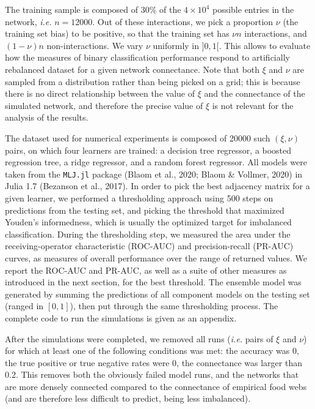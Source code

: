 \documentclass[10pt,oneside]{article}
\begin{document}
The training sample is composed of 30\% of the \(4\times 10^4\) possible
entries in the network, \emph{i.e.} \(n=12000\). Out of these
interactions, we pick a proportion \(\nu\) (the training set bias) to be
positive, so that the training set has \(\nu n\) interactions, and
\((1-\nu) n\) non-interactions. We vary \(\nu\) uniformly in \(]0,1[\).
This allows to evaluate how the measures of binary classification
performance respond to artificially rebalanced dataset for a given
network connectance. Note that both \(\xi\) and \(\nu\) are sampled from
a distribution rather than being picked on a grid; this is because there
is no direct relationship between the value of \(\xi\) and the
connectance of the simulated network, and therefore the precise value of
\(\xi\) is not relevant for the analysis of the results.

The dataset used for numerical experiments is composed of 20000 such
\((\xi, \nu)\) pairs, on which four learners are trained: a decision
tree regressor, a boosted regression tree, a ridge regressor, and a
random forest regressor. All models were taken from the \texttt{MLJ.jl}
package (Blaom et al., 2020; Blaom \& Vollmer, 2020) in Julia 1.7
(Bezanson et al., 2017). In order to pick the best adjacency matrix for
a given learner, we performed a thresholding approach using 500 steps on
predictions from the testing set, and picking the threshold that
maximized Youden's informedness, which is usually the optimized target
for imbalanced classification. During the thresholding step, we measured
the area under the receiving-operator characteristic (ROC-AUC) and
precision-recall (PR-AUC) curves, as measures of overall performance
over the range of returned values. We report the ROC-AUC and PR-AUC, as
well as a suite of other measures as introduced in the next section, for
the best threshold. The ensemble model was generated by summing the
predictions of all component models on the testing set (ranged in
\([0,1]\)), then put through the same thresholding process. The complete
code to run the simulations is given as an appendix.

After the simulations were completed, we removed all runs (\emph{i.e.}
pairs of \(\xi\) and \(\nu\)) for which at least one of the following
conditions was met: the accuracy was 0, the true positive or true
negative rates were 0, the connectance was larger than 0.2. This removes
both the obviously failed model runs, and the networks that are more
densely connected compared to the connectance of empirical food webs
(and are therefore less difficult to predict, being less imbalanced).
\end{document}
